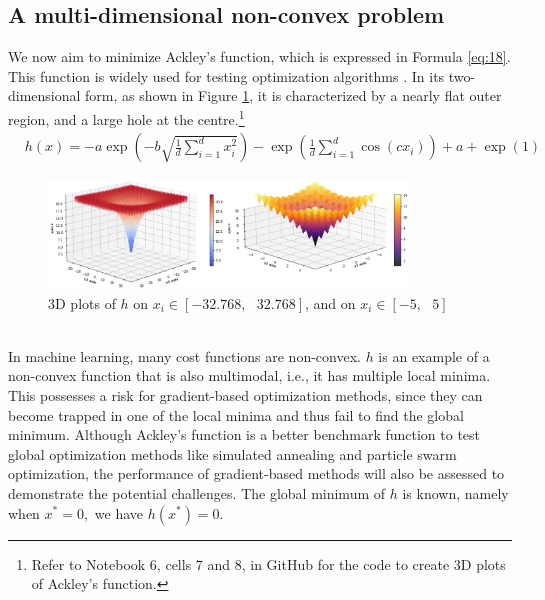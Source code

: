 \subsection{A multi-dimensional non-convex problem}
We now aim to minimize Ackley's function, which is expressed in Formula \eqref{eq:18}. This function is widely used for testing optimization algorithms \cite{Test_functions}. In its two-dimensional form, as shown in Figure \ref{fig:Ackelys_plot}, it is characterized by a nearly flat outer region, and a large hole at the centre.\footnote{Refer to Notebook 6, cells 7 and 8, in GitHub \cite{ThesisCode2023} for the code to create 3D plots of Ackley's function.}
\begin{equation*}\label{eq:18}\tag{6.3.1}
\begin{aligned}
&h(x) = -a\exp\left(-b\sqrt{\frac{1}{d}\sum_{i=1}^{d} x_{i}^{2}}\right) - \exp\left(\frac{1}{d}\sum_{i=1}^{d} \cos(cx_{i})\right) + a + \exp(1) 
\end{aligned}
\end{equation*}
\begin{figure}[h!]
    \centering
        \includegraphics[width=0.85\textwidth]{Pictures/Merged_Ackleys_plot.png}
    \caption{3D plots of $h$ on $x_{i} \in [-32.768,\text{ } 32.768]$, and on $x_{i} \in [-5,\text{ } 5]$}\label{fig:Ackelys_plot}
\end{figure}\\
In machine learning, many cost functions are non-convex. $h$ is an example of a non-convex function that is also multimodal, i.e., it has multiple local minima. This possesses a risk for gradient-based optimization methods, since they can become trapped in one of the local minima and thus fail to find the global minimum. Although Ackley's function is a better benchmark function to test global optimization methods like simulated annealing and particle swarm optimization, the performance of gradient-based methods will also be assessed to demonstrate the potential challenges. The global minimum of $h$ is known, namely when $x^{*} = 0,$ we have $h(x^{*}) = 0.$ 
